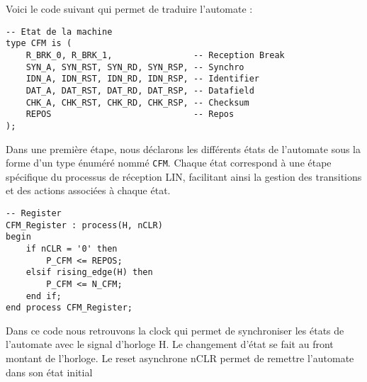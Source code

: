 Voici le code suivant qui permet de traduire l'automate : 
\newline

\begin{lstlisting}[style=VHDLStyle, caption={Declaration des états}]
-- Etat de la machine
type CFM is (
    R_BRK_0, R_BRK_1,                -- Reception Break
    SYN_A, SYN_RST, SYN_RD, SYN_RSP, -- Synchro
    IDN_A, IDN_RST, IDN_RD, IDN_RSP, -- Identifier
    DAT_A, DAT_RST, DAT_RD, DAT_RSP, -- Datafield
    CHK_A, CHK_RST, CHK_RD, CHK_RSP, -- Checksum
    REPOS                            -- Repos
);
\end{lstlisting}

Dans une première étape, nous déclarons les différents états de l’automate sous la forme d’un type énuméré nommé \texttt{CFM}.
Chaque état correspond à une étape spécifique du processus de réception LIN, facilitant ainsi la gestion des transitions et des actions associées à chaque état.
\newline


\begin{lstlisting}[style=VHDLStyle, caption={Registres Reception Trame}]
-- Register
CFM_Register : process(H, nCLR)
begin
    if nCLR = '0' then
        P_CFM <= REPOS;
    elsif rising_edge(H) then
        P_CFM <= N_CFM;
    end if;
end process CFM_Register;
\end{lstlisting}

Dans ce code nous retrouvons la clock qui permet de synchroniser les états de l'automate avec le signal d'horloge H.
Le changement d'état se fait au front montant de l'horloge.
Le reset asynchrone nCLR permet de remettre l'automate dans son état initial
\newline

